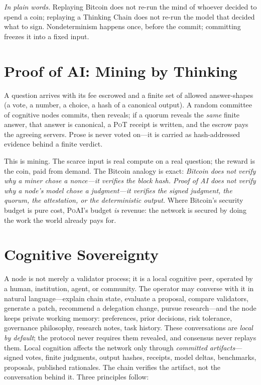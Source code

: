 \documentclass[11pt]{article}
\newcommand{\PoT}{\textsc{PoT}}
\newcommand{\PoAI}{\textsc{PoAI}}
\begin{document}
\noindent\emph{In plain words.} Replaying Bitcoin does not re-run the mind of whoever decided to spend a coin; replaying a Thinking Chain does not re-run the model that decided what to sign. Nondeterminism happens once, before the commit; committing freezes it into a fixed input.

\section{Proof of AI: Mining by Thinking}

A question arrives with its fee escrowed and a finite set of allowed answer-shapes (a vote, a number, a choice, a hash of a canonical output). A random committee of cognitive nodes commits, then reveals; if a quorum reveals the \emph{same} finite answer, that answer is canonical, a \PoT{} receipt is written, and the escrow pays the agreeing servers. Prose is never voted on---it is carried as hash-addressed evidence behind a finite verdict.

This is mining. The scarce input is real compute on a real question; the reward is the coin, paid from demand. The Bitcoin analogy is exact: \emph{Bitcoin does not verify why a miner chose a nonce---it verifies the block hash. Proof of AI does not verify why a node's model chose a judgment---it verifies the signed judgment, the quorum, the attestation, or the deterministic output.} Where Bitcoin's security budget is pure cost, \PoAI{}'s budget \emph{is} revenue: the network is secured by doing the work the world already pays for.

\section{Cognitive Sovereignty}

A node is not merely a validator process; it is a local cognitive peer, operated by a human, institution, agent, or community. The operator may converse with it in natural language---explain chain state, evaluate a proposal, compare validators, generate a patch, recommend a delegation change, pursue research---and the node keeps private working memory: preferences, prior decisions, risk tolerance, governance philosophy, research notes, task history. These conversations are \emph{local by default}; the protocol never requires them revealed, and consensus never replays them. Local cognition affects the network only through \emph{committed artifacts}---signed votes, finite judgments, output hashes, receipts, model deltas, benchmarks, proposals, published rationales. The chain verifies the artifact, not the conversation behind it. Three principles follow:
\end{document}
